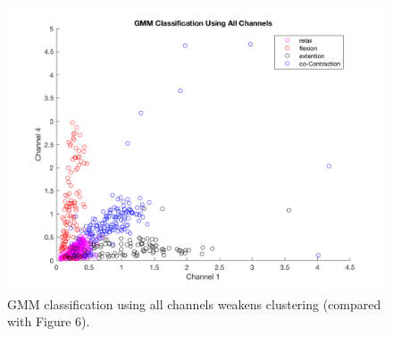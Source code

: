 \documentclass[times, 10pt,twocolumn]{article}
\begin{document}
\begin{figure}[h]
  \includegraphics[width=\linewidth]{Figures/f13.png}
  \caption{GMM classification using all channels weakens clustering (compared with Figure 6).}
  \label{GMMall}
\end{figure}
\end{document}
